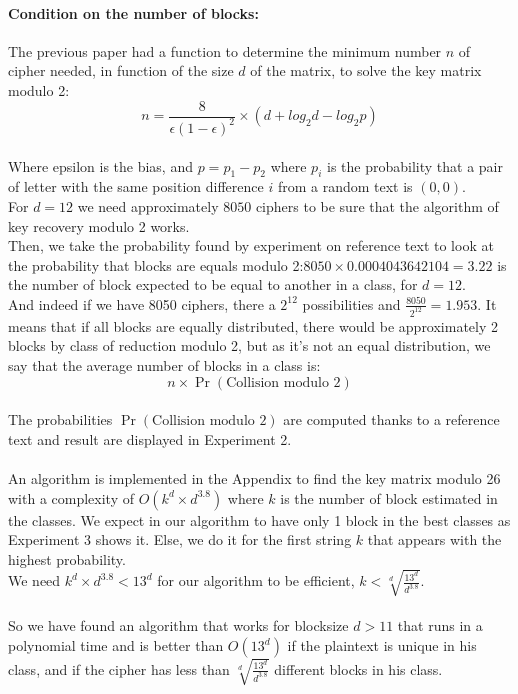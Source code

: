 \documentclass{article}
\begin{document}
\paragraph{Condition on the number of blocks:}
The previous paper had a function to determine the minimum number $n$ of cipher needed, in function of the size $d$ of the matrix, to solve the key matrix modulo 2:
$$n = \frac{8}{\epsilon (1- \epsilon)^2} \times (d +log_2 d - log_2 p) $$\\
Where epsilon is the bias, and $p=p_1-p_2$ where $p_i$ is the probability that a pair of letter with the same position difference $i$ from a random text is $(0,0)$.\\
For $d=12$ we need approximately $8050$ ciphers to be sure that the algorithm of key recovery modulo 2 works.\\
Then, we take the probability found by experiment on reference text to look at the probability that blocks are equals modulo 2:$8050 \times 0.0004043642104 = 3.22$ is the number of block expected to be equal to another in a class, for $d=12$.\\
And indeed if we have 8050 ciphers, there a $2^{12}$ possibilities and $\frac{8050}{2^{12}} = 1.953$. It means that if all blocks are equally distributed, there would be approximately 2 blocks by class of reduction modulo 2, but as it's not an equal distribution, we say that the average number of blocks in a class is: $$n \times \Pr(\text{Collision modulo 2}) $$\\
The probabilities $\Pr(\text{Collision modulo 2})$ are computed thanks to a reference text and result are displayed in Experiment 2.\\
\\
An algorithm is implemented in the Appendix to find the key matrix modulo 26 with a complexity of $O(k^d \times d^{3.8})$ where $k$ is the number of block estimated in the classes. We expect in our algorithm to have only 1 block in the best classes as Experiment 3 shows it. Else, we do it for the first string $k$ that appears with the highest probability.\\
We need $k^d \times d^{3.8} < 13^d$ for our algorithm to be efficient, $k<\sqrt[d\,]{\frac{13^d}{d^{3.8}}}$.\\
\\
So we have found an algorithm that works for blocksize $d>11$ that runs in a polynomial time and is better than $O(13^d)$ if the plaintext is unique in his class, and if the cipher has less than $\sqrt[d\,]{\frac{13^d}{d^{3.8}}}$ different blocks in his class.\\
\end{document}
